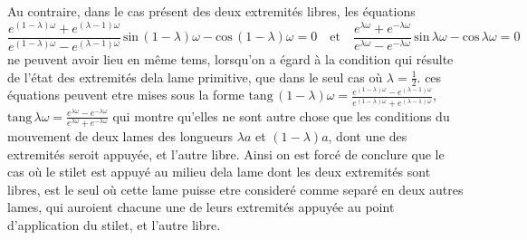\documentclass[11pt,a4paper]{article}
\begin{document}

Au contraire, dans le cas présent des deux extremités libres, les équations
\[ \frac{e^{(1-\lambda)\omega} + e^{(\lambda-1)\omega}}{e^{(1-\lambda)\omega} - e^{(\lambda-1)\omega}}\,\text{sin}\,(1-\lambda)\omega - \text{cos}\,(1-\lambda)\omega = 0 \quad\text{et}\quad \frac{e^{\lambda\omega} + e^{-\lambda\omega}}{e^{\lambda\omega} - e^{-\lambda\omega}}\,\text{sin}\,\lambda\omega - \text{cos}\,\lambda\omega = 0 \]
ne peuvent avoir lieu en même tems, lorsqu'on a égard à la condition qui résulte de l'état
des extremités dela lame primitive, que dans le seul cas où $\lambda = \frac{1}{2}$. ces équations
peuvent etre mises sous la forme $\text{tang}\,(1-\lambda)\omega = \frac{e^{(1-\lambda)\omega} - e^{(\lambda-1)\omega}}{e^{(1-\lambda)\omega} + e^{(\lambda-1)\omega}}$, $\text{tang}\,\lambda\omega = \frac{e^{\lambda\omega} - e^{-\lambda\omega}}{e^{\lambda\omega} + e^{-\lambda\omega}}$
qui montre qu'elles ne sont autre chose que les conditions du mouvement de
deux lames des longueurs $\lambda a$ et $(1-\lambda)a$, dont une des extremités seroit appuyée, et
l'autre libre. Ainsi on est forcé de conclure que le cas où le stilet est appuyé
au milieu dela lame dont les deux extremités sont libres, est le seul où cette
lame puisse etre consideré comme separé en deux autres lames, qui auroient
chacune une de leurs extremités appuyée au point d'application du stilet, et
l'autre libre.
\end{document}
